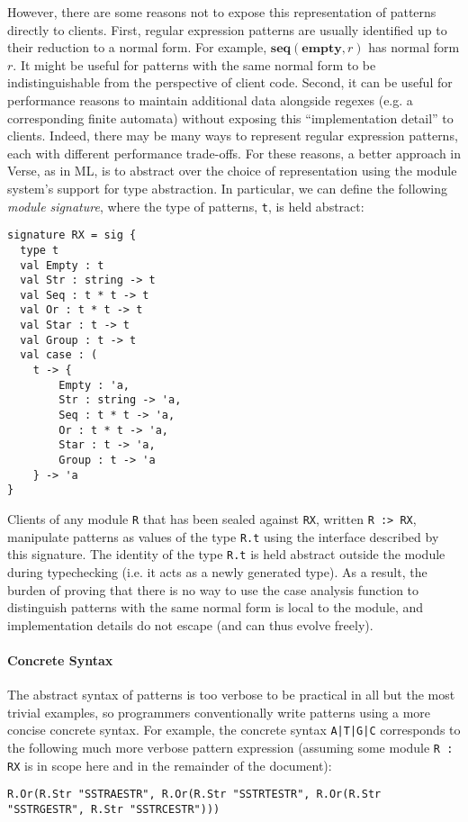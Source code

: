 However, there are some reasons not to expose this representation of patterns directly to clients. First, regular expression patterns are usually identified up to their reduction to a normal form. For example, $\textbf{seq}(\textbf{empty}, r)$ has normal form $r$. It might be useful for patterns with the same normal form to be  indistinguishable from the perspective of client code. Second, it can be useful for performance reasons to maintain additional data alongside regexes (e.g. a corresponding finite automata) without exposing this ``implementation detail'' to clients. Indeed, there may be many ways to represent regular expression patterns, each with different performance trade-offs. For these reasons, a better approach in Verse, as in ML, is to abstract over the choice of representation using  the module system's support for type abstraction. In particular, we can define the following \emph{module signature}, where the type of patterns, \lstinline{t}, is held abstract:

\begin{lstlisting}[deletekeywords={case},numbers=none]
signature RX = sig {
  type t
  val Empty : t
  val Str : string -> t
  val Seq : t * t -> t
  val Or : t * t -> t
  val Star : t -> t
  val Group : t -> t
  val case : (
    t -> {
    	Empty : 'a,
    	Str : string -> 'a,
    	Seq : t * t -> 'a,
    	Or : t * t -> 'a,
    	Star : t -> 'a,
    	Group : t -> 'a
    } -> 'a
}
\end{lstlisting}
 Clients of any module \lstinline{R} that has been sealed against \lstinline{RX}, written \lstinline{R :> RX}, manipulate patterns as values of the type \verb|R.t| using the interface described by this signature. The identity of the type \lstinline{R.t} is held abstract outside the module during typechecking (i.e. it acts as a newly generated type). As a result, the burden of proving that there is no way to use the case analysis function to distinguish patterns with the same normal form is local to the module, and implementation details do not escape (and can thus evolve freely). %

\paragraph{Concrete Syntax} The abstract syntax of patterns is too verbose to be practical  in all but the most trivial examples, so programmers conventionally write patterns using a more concise concrete syntax. For example, the concrete syntax \lstinline{A|T|G|C} corresponds to the following much more verbose pattern expression (assuming some module \lstinline{R : RX} is in scope here and in the remainder of the document):
\begin{lstlisting}[numbers=none,mathescape=|]
R.Or(R.Str "SSTRAESTR", R.Or(R.Str "SSTRTESTR", R.Or(R.Str "SSTRGESTR", R.Str "SSTRCESTR")))
\end{lstlisting} 



